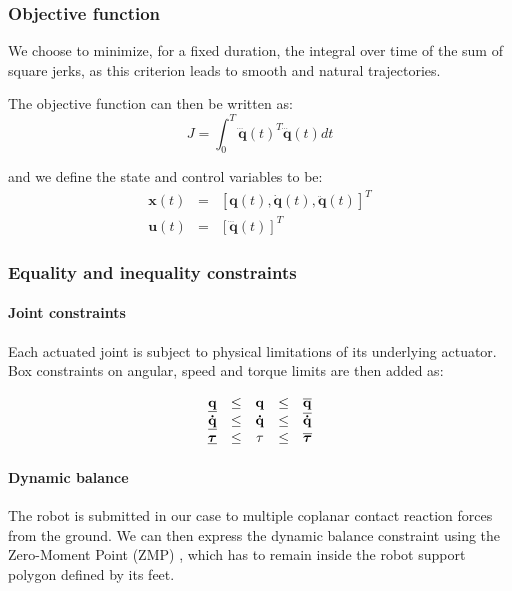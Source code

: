 \subsubsection{Objective function}

We choose to minimize, for a fixed duration, the integral over time of
the sum of square jerks, as this criterion leads to smooth and natural
trajectories.

The objective function can then be written as:
\begin{equation}
  J = \int_{0}^{T}\mathbf{\dddot{q}}(t)^T\mathbf{\dddot{q}}(t) dt
  \label{objective-function}
\end{equation}

and we define the state and control variables to be:
\begin{equation}
  \begin{array}{rcl}
  \mathbf{x}(t) & = & [\mathbf{q}(t), \mathbf{\dot{q}}(t), \mathbf{\ddot{q}}(t)]^T \\
  \mathbf{u}(t) & = & [\mathbf{\dddot{q}}(t)]^T
  \end{array}
  \label{variables}
\end{equation}

\subsubsection{Equality and inequality constraints}

\paragraph{Joint constraints}
Each actuated joint is subject to physical limitations of its
underlying actuator. Box constraints on angular, speed and torque
limits are then added as:

\begin{equation}
  \begin{array}{rcccl}
    \underline{\mathbf{q}} & \le & \mathbf{q} & \le & \overline{\mathbf{q}} \\
    \underline{\mathbf{\dot{q}}} & \le & \mathbf{\dot{q}} & \le & \overline{\mathbf{\dot{q}}} \\
    \underline{\boldsymbol{\tau}} & \le & \mathbf{\tau} & \le & \overline{\boldsymbol{\tau}}
  \end{array}
  \label{joint-constraints}
\end{equation}

\paragraph{Dynamic balance}
The robot is submitted in our case to multiple coplanar contact
reaction forces from the ground. We can then express the dynamic
balance constraint using the Zero-Moment Point (ZMP)
\cite{Vukobratovic2004zero}, which has to remain inside the robot
support polygon defined by its feet.

